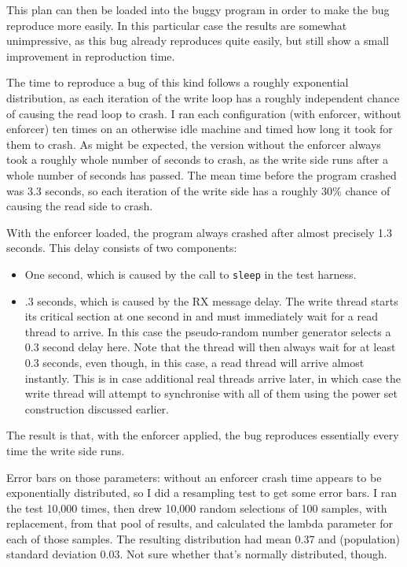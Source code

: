 This plan can then be loaded into the buggy program in order to make
the bug reproduce more easily.  In this particular case the results
are somewhat unimpressive, as this bug already reproduces quite
easily, but still show a small improvement in reproduction time.

The time to reproduce a bug of this kind follows a roughly exponential
distribution, as each iteration of the write loop has a roughly
independent chance of causing the read loop to crash.  I ran each
configuration (with enforcer, without enforcer) ten times on an
otherwise idle machine and timed how long it took for them to crash.
As might be expected, the version without the enforcer always took a
roughly whole number of seconds to crash, as the write side runs after
a whole number of seconds has passed.  The mean time before the
program crashed was 3.3 seconds, so each iteration of the write side
has a roughly 30\% chance of causing the read side to crash.

With the enforcer loaded, the program always crashed after almost
precisely 1.3 seconds.  This delay consists of two components:

\begin{itemize}
\item One second, which is caused by the call to \verb|sleep| in the
  test harness.
\item .3 seconds, which is caused by the RX message delay.  The write
  thread starts its critical section at one second in and must
  immediately wait for a read thread to arrive.  In this case the
  pseudo-random number generator selects a 0.3 second delay here.
  Note that the thread will then always wait for at least 0.3 seconds,
  even though, in this case, a read thread will arrive almost
  instantly.  This is in case additional real threads arrive later, in
  which case the write thread will attempt to synchronise with all of
  them using the power set construction discussed earlier.
\end{itemize}


The result is that, with the enforcer applied, the bug reproduces
essentially every time the write side runs.

Error bars on those parameters: without an enforcer crash time appears
to be exponentially distributed, so I did a resampling test to get
some error bars.  I ran the test 10,000 times, then drew 10,000 random
selections of 100 samples, with replacement, from that pool of
results, and calculated the lambda parameter for each of those
samples.  The resulting distribution had mean 0.37 and (population)
standard deviation 0.03.  Not sure whether that's normally
distributed, though.

